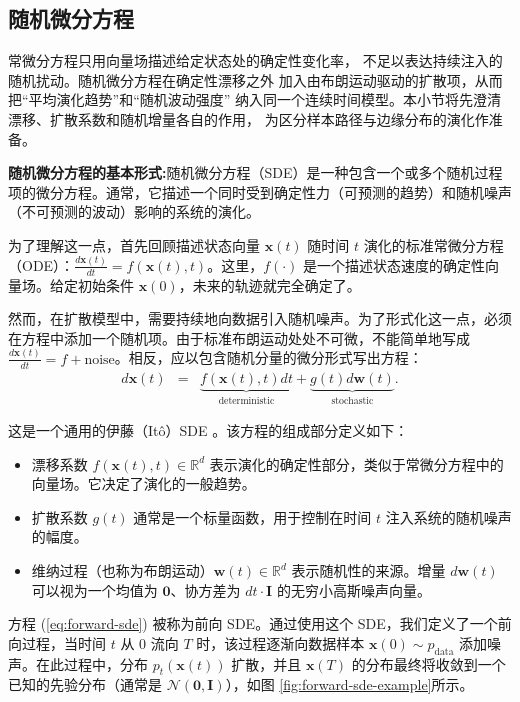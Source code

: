 \subsection{随机微分方程}

常微分方程只用向量场描述给定状态处的确定性变化率，
不足以表达持续注入的随机扰动。随机微分方程在确定性漂移之外
加入由布朗运动驱动的扩散项，从而把“平均演化趋势”和“随机波动强度”
纳入同一个连续时间模型。本小节将先澄清漂移、扩散系数和随机增量各自的作用，
为区分样本路径与边缘分布的演化作准备。

\textbf{随机微分方程的基本形式:}随机微分方程（SDE）是一种包含一个或多个随机过程项的微分方程。通常，它描述一个同时受到确定性力（可预测的趋势）和随机噪声（不可预测的波动）影响的系统的演化。

为了理解这一点，首先回顾描述状态向量 $\mathbf{x}(t)$ 随时间 $t$ 演化的标准常微分方程（ODE）：$\frac{d\mathbf{x}(t)}{dt} = f(\mathbf{x}(t), t)$。这里，$f(\cdot)$ 是一个描述状态速度的确定性向量场。给定初始条件 $\mathbf{x}(0)$，未来的轨迹就完全确定了。

然而，在扩散模型中，需要持续地向数据引入随机噪声。为了形式化这一点，必须在方程中添加一个随机项。由于标准布朗运动处处不可微，不能简单地写成 $\frac{d\mathbf{x}(t)}{dt} = f + \text{noise}$。相反，应以包含随机分量的微分形式写出方程：
\begin{eqnarray}
d\mathbf{x}(t) & = & \underbrace{f(\mathbf{x}(t), t) dt}_{\text{deterministic}} + \underbrace{g(t) d\mathbf{w}(t)}_{\text{stochastic}}.
\label{eq:forward-sde}
\end{eqnarray}

这是一个通用的伊藤（It{\^o}）SDE 。该方程的组成部分定义如下：

\begin{itemize}
\item 漂移系数 $f(\mathbf{x}(t), t) \in \mathbb{R}^d$ 表示演化的确定性部分，类似于常微分方程中的向量场。它决定了演化的一般趋势。
\item 扩散系数 $g(t)$ 通常是一个标量函数，用于控制在时间 $t$ 注入系统的随机噪声的幅度。
\item 维纳过程（也称为布朗运动）$\mathbf{w}(t) \in \mathbb{R}^d$ 表示随机性的来源。增量 $d\mathbf{w}(t)$ 可以视为一个均值为 $\mathbf{0}$、协方差为 $dt \cdot \mathbf{I}$ 的无穷小高斯噪声向量。
\end{itemize}

方程 (\ref{eq:forward-sde}) 被称为前向 SDE。通过使用这个 SDE，我们定义了一个前向过程，当时间 $t$ 从 $0$ 流向 $T$ 时，该过程逐渐向数据样本 $\mathbf{x}(0) \sim p_{\text{data}}$ 添加噪声。在此过程中，分布 $p_t(\mathbf{x}(t))$ 扩散，并且 $\mathbf{x}(T)$ 的分布最终将收敛到一个已知的先验分布（通常是 $\mathcal{N}(\mathbf{0}, \mathbf{I})$），如图 \ref{fig:forward-sde-example}所示。

